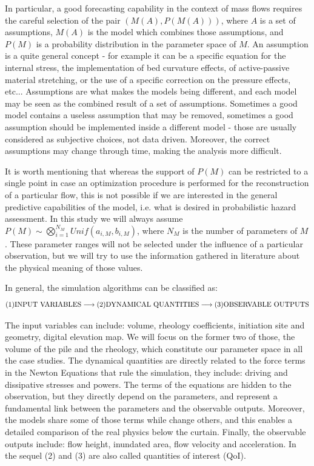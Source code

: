 \documentclass{article}
\begin{document}
In particular, a good forecasting capability in the context of mass flows requires the careful selection of the pair $(M(A), P(M(A)))$, where $A$ is a set of assumptions, $M(A)$ is the model which combines those assumptions, and $P(M)$ is a probability distribution in the parameter space of $M$. An assumption is a quite general concept - for example it can be a specific equation for the internal stress, the implementation of bed curvature effects, of active-passive material stretching, or the use of a specific correction on the pressure effects, etc... Assumptions are what makes the models being different, and each model may be seen as the combined result of a set of assumptions. Sometimes a good model contains a useless assumption that may be removed, sometimes a good assumption should be implemented inside a different model - those are usually considered as subjective choices, not data driven. Moreover, the correct assumptions may change through time, making the analysis more difficult.

It is worth mentioning that whereas the support of $P(M)$ can be restricted to a single point in case an optimization procedure is performed for the reconstruction of a particular flow, this is not possible if we are interested in the general predictive capabilities of the model, i.e. what is desired in probabilistic hazard assessment. In this study we will always assume $P(M)\sim \bigotimes_{i=1}^{N_M} Unif(a_{i,M},b_{i,M})$, where $N_M$ is the number of parameters of $M$. These parameter ranges will not be selected under the influence of a particular observation, but we will try to use the information gathered in literature about the physical meaning of those values.

In general, the simulation algorithms can be classified as:
$$\textmd{(1)INPUT VARIABLES} \longrightarrow \textmd{(2)DYNAMICAL QUANTITIES} \longrightarrow \textmd{(3)OBSERVABLE OUTPUTS}$$

The input variables can include: volume, rheology coefficients, initiation site and geometry, digital elevation map. We will focus on the former two of those, the volume of the pile and the rheology, which constitute our parameter space in all the case studies. The dynamical quantities are directly related to the force terms in the Newton Equations that rule the simulation, they include: driving and dissipative stresses and powers. The terms of the equations are hidden to the observation, but they directly depend on the parameters, and represent a fundamental link between the parameters and the observable outputs. Moreover, the models share some of those terms while change others, and this enables a detailed comparison of the real physics below the curtain. Finally, the observable outputs include: flow height, inundated area, flow velocity and acceleration. In the sequel (2) and (3) are also called quantities of interest (QoI).
\end{document}
